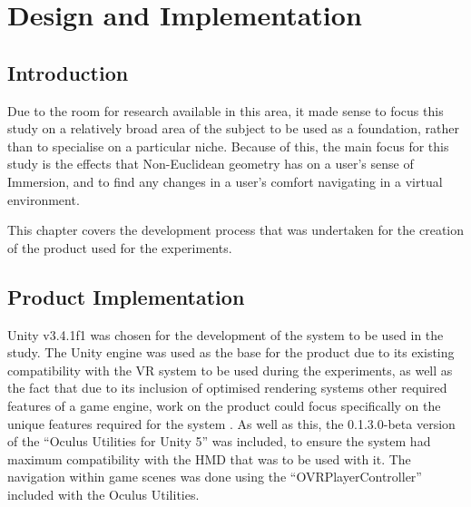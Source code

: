 \chapter[Product]{Design and Implementation}
\label{design}

	\section{Introduction}
	\label{design:intro}

		Due to the room for research available in this area, it made sense to focus this study on a relatively broad area of the subject to be used as a foundation, rather than to specialise on a particular niche.
		Because of this, the main focus for this study is the effects that Non-Euclidean geometry has on a user's sense of Immersion, and to find any changes in a user's comfort navigating in a virtual environment.

		This chapter covers the development process that was undertaken for the creation of the product used for the experiments.






	\section[Implementation]{Product Implementation}
	\label{design:model}

		Unity v3.4.1f1 \cite{UnityTechnologies2016} was chosen for the development of the system to be used in the study.
		The Unity engine was used as the base for the product due to its existing compatibility with the VR system to be used during the experiments, as well as the fact that due to its inclusion of optimised rendering systems other required features of a game engine, work on the product could focus specifically on the unique features required for the system \cite{Bruce2012}.
		As well as this, the 0.1.3.0-beta version of the \enquote{Oculus Utilities for Unity 5} \cite{Oculus2016} was included, to ensure the system had maximum compatibility with the HMD that was to be used with it.
		The navigation within game scenes was done using the \enquote{OVRPlayerController} included with the Oculus Utilities.


